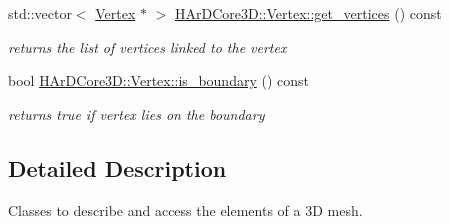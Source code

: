 \begin{DoxyCompactItemize}
\mbox{\label{group__Mesh_gae2f7c53199b70d404213a3290c1e362e}} 
std\+::vector$<$ \hyperlink{classHArDCore3D_1_1Vertex}{Vertex} $\ast$ $>$ \hyperlink{group__Mesh_gae2f7c53199b70d404213a3290c1e362e}{H\+Ar\+D\+Core3\+D\+::\+Vertex\+::get\+\_\+vertices} () const
\begin{DoxyCompactList}\small\item\em returns the list of vertices linked to the vertex \end{DoxyCompactList}\item 
\mbox{\label{group__Mesh_ga9e2928610513ecdb04bef03cb98abd9f}} 
bool \hyperlink{group__Mesh_ga9e2928610513ecdb04bef03cb98abd9f}{H\+Ar\+D\+Core3\+D\+::\+Vertex\+::is\+\_\+boundary} () const
\begin{DoxyCompactList}\small\item\em returns true if vertex lies on the boundary \end{DoxyCompactList}\end{DoxyCompactItemize}


\subsection{Detailed Description}
Classes to describe and access the elements of a 3D mesh. 

